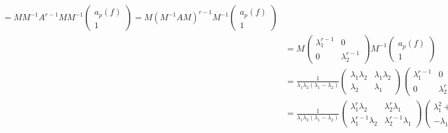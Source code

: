 \documentclass{article}
\begin{document}
\begin{enumerate}[(a)]
\begin{align*}
        = MM^{-1}A^{r-1}MM^{-1} \begin{pmatrix}
            a_p(f)\\1
        \end{pmatrix} = M (M^{-1}AM)^{r-1}M^{-1} \begin{pmatrix}
            a_p(f)\\1
        \end{pmatrix}\\
        &= M\begin{pmatrix}
            \lambda_1^{r-1} & 0\\
            0 & \lambda_2^{r-1}
        \end{pmatrix} M^{-1} \begin{pmatrix}
            a_p(f)\\1
        \end{pmatrix}\\
        &= \frac{1}{\lambda_1\lambda_2(\lambda_1-\lambda_2)} 
        \begin{pmatrix}
            \lambda_1\lambda_2 & \lambda_1\lambda_2\\
            \lambda_2 & \lambda_1
        \end{pmatrix} \begin{pmatrix}
            \lambda_1^{r-1} & 0\\
            0 & \lambda_2^{r-1}
        \end{pmatrix} \begin{pmatrix}
            \lambda_1 & -\lambda_1\lambda_2\\
            -\lambda_2&  \lambda_1\lambda_2
        \end{pmatrix}\begin{pmatrix}
            \lambda_1 + \lambda_2\\1
        \end{pmatrix}\\
        &= \frac{1}{\lambda_1\lambda_2(\lambda_1-\lambda_2)} \begin{pmatrix}
            \lambda_1^{r}\lambda_2 &\lambda_2^{r}\lambda_1\\
            \lambda_1^{r-1}\lambda_2 & \lambda_2^{r-1}\lambda_1
        \end{pmatrix}\begin{pmatrix}
            \lambda_1^2 + \lambda_1\lambda_2 - \lambda_1\lambda_2\\
            -\lambda_1\lambda_2 - \lambda_2^2 + \lambda_1\lambda_2
        \end{pmatrix}\\

\end{align*}
\end{enumerate}
\end{document}
